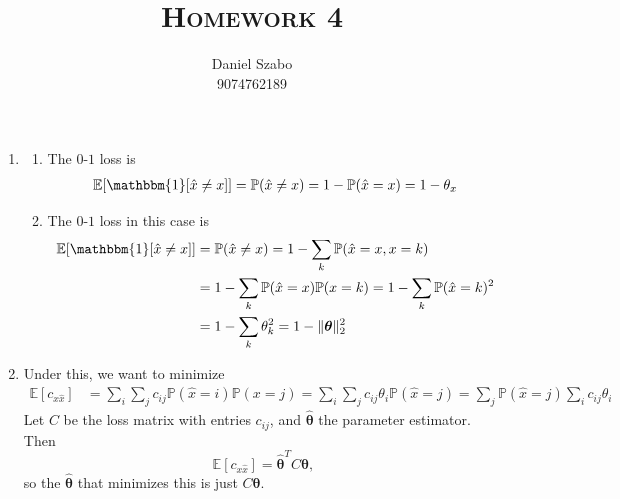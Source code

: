 \documentclass[a4paper]{article}
\title{\textsc{Homework 4}} %
\author{
	Daniel Szabo \\
	9074762189\\
}
\date{}
\theoremstyle{definition}
\def\E{\mathbb E}
\def\Pp{\mathbb P}
\def\one{\mathbbm{1}}
\begin{document}
	
	\maketitle 
	
	\begin{enumerate}
		\item \begin{enumerate}
			\item 
			The $ 0$-$1 $ loss is 
		\begin{align*}
			\E[\one [\hat x \neq x]] = \mathbb{P}(\hat x \neq x) = 1-\mathbb{P}(\hat x=x) = 1-\theta_x
		\end{align*}
	
		\item The $ 0$-$1 $ loss in this case is 
		\begin{align*}
			\E[\one[\hat x \neq x]] &= \mathbb{P}(\hat x \neq x) = 1-\sum_{k} \Pp(\hat x=x, x=k)\\
			&= 1-\sum_{k} \Pp(\hat x=x)\Pp(x=k) = 1-\sum_{k} \Pp(\hat x=k)^2\\
			&= 1- \sum_{k} \theta_k^2 = 1 - \| \boldsymbol{\theta} \|_2^2
		\end{align*}
		\end{enumerate}
	
	\item Under this, we want to minimize
	\begin{align*}
		\E[c_{x\hat x}] &= \sum_{i}\sum_{j} c_{ij}\Pp(\hat x = i) \Pp(x = j) = \sum_{i}\sum_{j} c_{i j} \theta_i \Pp(\hat x = j) = \sum_{j} \Pp(\hat x = j) \sum_{i} c_{i j} \theta_i
	\end{align*}
	Let $ C $ be the loss matrix with entries $ c_{ij} $, and $ \boldsymbol{\hat \theta} $ the parameter estimator. Then
	\[ \E[c_{x\hat x}] = \boldsymbol{\hat \theta}^T C \boldsymbol{\theta}, \]
	so the $ \boldsymbol{\hat \theta} $ that minimizes this is just $ C \boldsymbol{\theta} $.
	

\end{enumerate}
\end{document}
